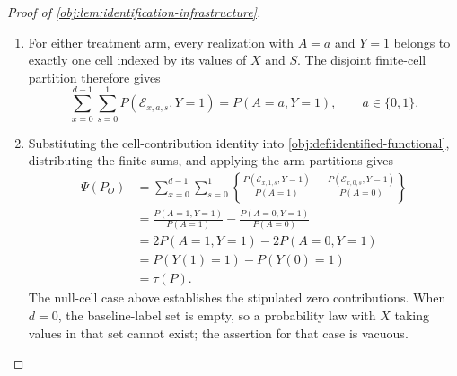\documentclass[11pt]{article}
\begin{document}
\begin{proof}[Proof of \cref{obj:lem:identification-infrastructure}]
\begin{enumerate}
We identify the weighted contribution by splitting according to the cell mass. If \(P(\mathcal E_{x,a,s})=0\), nonnegativity and event inclusion imply
\[
0\le P(\mathcal E_{x,a,s},Y=1)
\le P(\mathcal E_{x,a,s})=0.
\]
Hence both the weighted observed contribution and
\(P(\mathcal E_{x,a,s},Y=1)/P(A=a)\) are zero.

If \(P(\mathcal E_{x,a,s})>0\), event inclusion gives
\[
0<P(\mathcal E_{x,a,s})\le P(A=a).
\]
The arrival floor in \cref{obj:ass:arrival-floor} and the stipulated range of \(q\) give
\[
\frac{P(\mathcal E_{x,a,s},R=1)}
     {P(\mathcal E_{x,a,s})}
\ge q\ge\frac12>0,
\qquad
P(\mathcal E_{x,a,s},R=1)>0.
\]
Conditional independence in \cref{obj:ass:mar}, applied to \(R=1\) and \(Y=1\), gives the cross-product identity
\[
P(\mathcal E_{x,a,s},R=1,Y=1)\,
P(\mathcal E_{x,a,s})
=
P(\mathcal E_{x,a,s},R=1)\,
P(\mathcal E_{x,a,s},Y=1).
\]
Dividing by the two positive cell masses yields
\[
\mu_P(x,a,s)
=
\frac{P(\mathcal E_{x,a,s},R=1,Y=1)}
     {P(\mathcal E_{x,a,s},R=1)}
=
\frac{P(\mathcal E_{x,a,s},Y=1)}
     {P(\mathcal E_{x,a,s})}.
\]
Multiplication by the cell weight now proves, in both cases,
\[
\frac{P_O(\mathcal E_{x,a,s})}{P_O(A=a)}
\,\mu_P(x,a,s)
=
\frac{P(\mathcal E_{x,a,s},Y=1)}{P(A=a)}.
\]

\item For either treatment arm, every realization with \(A=a\) and \(Y=1\) belongs to exactly one cell indexed by its values of \(X\) and \(S\). The disjoint finite-cell partition therefore gives
\[
\sum_{x=0}^{d-1}\sum_{s=0}^{1}
P(\mathcal E_{x,a,s},Y=1)
=
P(A=a,Y=1),
\qquad a\in\{0,1\}.
\]

\item Substituting the cell-contribution identity into
\cref{obj:def:identified-functional}, distributing the finite sums, and applying the arm partitions gives
\[
\begin{aligned}
\Psi(P_O)
&=\sum_{x=0}^{d-1}\sum_{s=0}^{1}
\left\{
\frac{P(\mathcal E_{x,1,s},Y=1)}{P(A=1)}
-
\frac{P(\mathcal E_{x,0,s},Y=1)}{P(A=0)}
\right\}\\
&=\frac{P(A=1,Y=1)}{P(A=1)}
  -\frac{P(A=0,Y=1)}{P(A=0)}\\
&=2P(A=1,Y=1)-2P(A=0,Y=1)\\
&=P(Y(1)=1)-P(Y(0)=1)\\
&=\tau(P).
\end{aligned}
\]
The null-cell case above establishes the stipulated zero contributions. When \(d=0\), the baseline-label set is empty, so a probability law with \(X\) taking values in that set cannot exist; the assertion for that case is vacuous.
\end{enumerate}
\end{proof}
\end{document}
